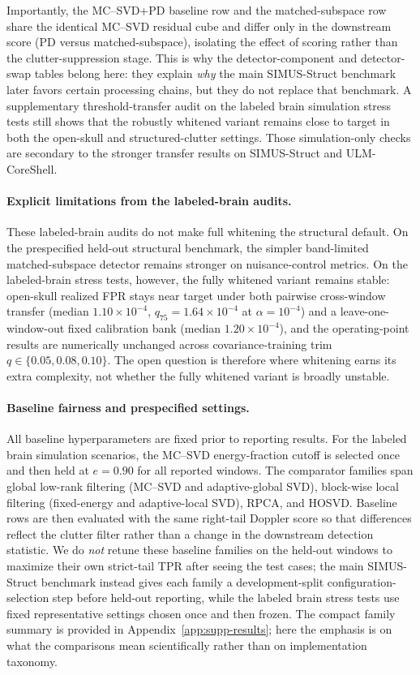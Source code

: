 \documentclass[11pt]{article}
\newif\ifPAPERONLY
\newcommand{\SuppOrApp}[1]{\ifPAPERONLY Supplementary Material\else Appendix~\ref{#1}\fi}
\begin{document}
\noindent Importantly, the MC--SVD+PD baseline row and the matched-subspace row share the identical MC--SVD residual cube and differ only in the downstream score (PD versus matched-subspace), isolating the effect of scoring rather than the clutter-suppression stage. This is why the detector-component and detector-swap tables belong here: they explain \emph{why} the main SIMUS-Struct benchmark later favors certain processing chains, but they do not replace that benchmark.
\noindent A supplementary threshold-transfer audit on the labeled brain simulation stress tests still shows that the robustly whitened variant remains close to target in both the open-skull and structured-clutter settings. Those simulation-only checks are secondary to the stronger transfer results on SIMUS-Struct and ULM-CoreShell.

\paragraph{Explicit limitations from the labeled-brain audits.}
These labeled-brain audits do not make full whitening the structural default. On the prespecified held-out structural benchmark, the simpler band-limited matched-subspace detector remains stronger on nuisance-control metrics. On the labeled-brain stress tests, however, the fully whitened variant remains stable: open-skull realized FPR stays near target under both pairwise cross-window transfer (median $1.10\times 10^{-4}$, $q_{75}=1.64\times 10^{-4}$ at $\alpha=10^{-4}$) and a leave-one-window-out fixed calibration bank (median $1.20\times 10^{-4}$), and the operating-point results are numerically unchanged across covariance-training trim $q\in\{0.05,0.08,0.10\}$. The open question is therefore where whitening earns its extra complexity, not whether the fully whitened variant is broadly unstable.

\paragraph{Baseline fairness and prespecified settings.}
All baseline hyperparameters are fixed prior to reporting results. For the labeled brain simulation scenarios, the MC--SVD energy-fraction cutoff is selected once and then held at $e=0.90$ for all reported windows. The comparator families span global low-rank filtering (MC--SVD and adaptive-global SVD), block-wise local filtering (fixed-energy and adaptive-local SVD), RPCA, and HOSVD. Baseline rows are then evaluated with the same right-tail Doppler score so that differences reflect the clutter filter rather than a change in the downstream detection statistic. We do \emph{not} retune these baseline families on the held-out windows to maximize their own strict-tail TPR after seeing the test cases; the main SIMUS-Struct benchmark instead gives each family a development-split configuration-selection step before held-out reporting, while the labeled brain stress tests use fixed representative settings chosen once and then frozen. The compact family summary is provided in \SuppOrApp{app:supp-results}; here the emphasis is on what the comparisons mean scientifically rather than on implementation taxonomy.
\end{document}
